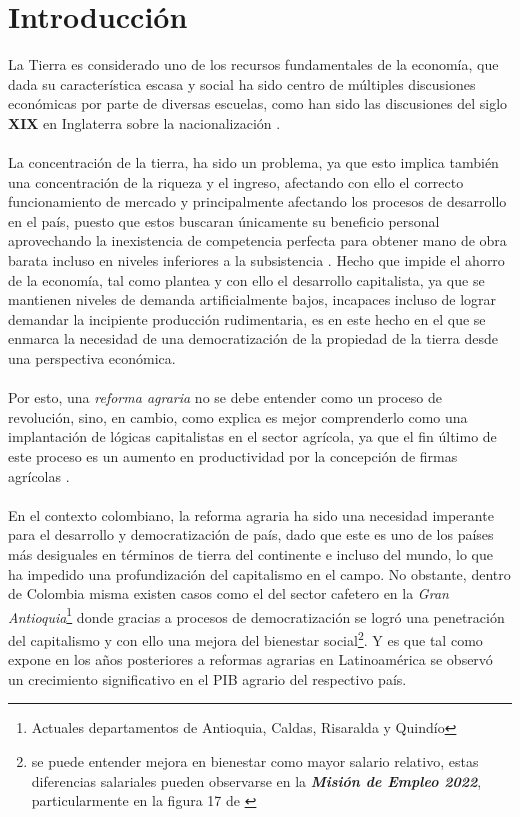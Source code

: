 \documentclass[11pt]{article}
\begin{document}
{\section{Introducción}
\begin{flushleft}
    La Tierra es considerado uno de los recursos fundamentales de la economía, que dada su característica escasa 
    y social ha sido centro de múltiples discusiones económicas por parte de diversas escuelas,
    como han sido las discusiones del siglo \textbf{XIX} en Inglaterra sobre la nacionalización \citep{Ramos2007}.
    \\~\\
    La concentración de la tierra, ha sido un problema, ya que esto implica también una concentración de la riqueza y el ingreso,
    afectando con ello el correcto funcionamiento de mercado y principalmente afectando los procesos de desarrollo en el país,
    puesto que estos buscaran únicamente su beneficio personal aprovechando la inexistencia de competencia perfecta para obtener mano de obra barata incluso en niveles inferiores a la subsistencia \citep{Cardenas1954}.
    Hecho que impide el ahorro de la economía, tal como plantea \citet{Say} y con ello el desarrollo capitalista, ya que se mantienen niveles de demanda artificialmente bajos,
    incapaces incluso de lograr demandar la incipiente producción rudimentaria, es en este hecho en el que se enmarca la necesidad de una democratización de la propiedad de la tierra desde una perspectiva económica.
    \\~\\
    Por esto, una \textit{reforma agraria} no se debe entender como un proceso de revolución, sino, en cambio, como explica \citet{lenin_1971}
    es mejor comprenderlo como una implantación de lógicas capitalistas en el sector agrícola, ya que el fin último de este proceso es un aumento 
    en productividad por la concepción de firmas agrícolas \citep{hamuy_1996}.
    \\~\\
    En el contexto colombiano, la reforma agraria ha sido una necesidad imperante para el desarrollo y democratización de país,
    dado que este es uno de los países más desiguales en términos de tierra del continente e incluso del mundo,
    lo que ha impedido una profundización del capitalismo en el campo. No obstante, 
    dentro de Colombia misma existen casos como el del sector cafetero en la \textit{Gran Antioquia}\footnote{Actuales departamentos de Antioquia, Caldas, Risaralda y Quindío} donde gracias a procesos de democratización se logró
    una penetración del capitalismo y con ello una mejora del bienestar social\footnote{se puede entender mejora en bienestar como mayor salario relativo, estas diferencias salariales pueden observarse en la \textit{\textbf{Misión de Empleo 2022}},
    particularmente en la figura 17 de \citep{AMM2021}}\citep{Vergara2011}. Y es que tal como expone \citet{Ocampo2001} en los años posteriores a reformas agrarias en Latinoamérica se observó un crecimiento significativo en el PIB agrario del respectivo país.\end{flushleft}

}
\end{document}
